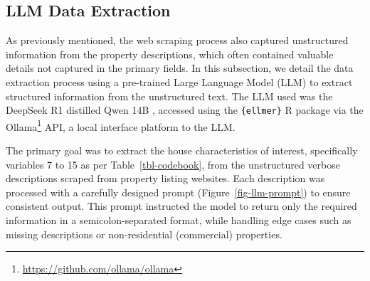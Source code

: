 \documentclass[
  number]{elsarticle}
\begin{document}
\subsection{LLM Data Extraction}\label{llm-data-extraction}

As previously mentioned, the web scraping process also captured
unstructured information from the property descriptions, which often
contained valuable details not captured in the primary fields. In this
subsection, we detail the data extraction process using a pre-trained
Large Language Model (LLM) to extract structured information from the
unstructured text. The LLM used was the DeepSeek R1 distilled Qwen 14B
\citep{deepseek2025deepseekr1, qwen2025qwen25}, accessed using the
\texttt{\{ellmer\}} R package \citep{wickham2025ellmer} via the
Ollama\footnote{\url{https://github.com/ollama/ollama}} API, a local
interface platform to the LLM.

The primary goal was to extract the house characteristics of interest,
specifically variables 7 to 15 as per Table~\ref{tbl-codebook}, from the
unstructured verbose descriptions scraped from property listing
websites. Each description was processed with a carefully designed
prompt (Figure~\ref{fig-llm-prompt}) to ensure consistent output. This
prompt instructed the model to return only the required information in a
semicolon-separated format, while handling edge cases such as missing
descriptions or non-residential (commercial) properties.
\end{document}
